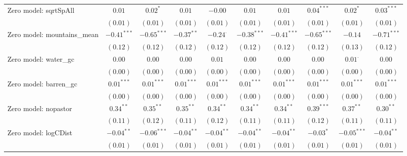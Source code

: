 \begin{sidewaystable}
\begin{center}
{\begin{tabular}{l c c c c c c c c c}
Zero model: sqrtSpAll          & $0.01$        & $0.02^{*}$    & $0.01$        & $-0.00$         & $0.01$        & $0.01$        & $0.04^{***}$  & $0.02^{*}$     & $0.03^{***}$  \\
                               & $(0.01)$      & $(0.01)$      & $(0.01)$      & $(0.01)$        & $(0.01)$      & $(0.01)$      & $(0.01)$      & $(0.01)$       & $(0.01)$      \\
Zero model: mountains\_mean    & $-0.41^{***}$ & $-0.65^{***}$ & $-0.37^{**}$  & $-0.24^{\cdot}$ & $-0.38^{***}$ & $-0.41^{***}$ & $-0.65^{***}$ & $-0.14$        & $-0.71^{***}$ \\
                               & $(0.12)$      & $(0.12)$      & $(0.12)$      & $(0.12)$        & $(0.12)$      & $(0.12)$      & $(0.12)$      & $(0.13)$       & $(0.12)$      \\
Zero model: water\_gc          & $0.00$        & $0.00$        & $0.00$        & $0.01$          & $0.00$        & $0.00$        & $0.00$        & $0.01^{\cdot}$ & $0.00$        \\
                               & $(0.00)$      & $(0.00)$      & $(0.00)$      & $(0.00)$        & $(0.00)$      & $(0.00)$      & $(0.00)$      & $(0.00)$       & $(0.00)$      \\
Zero model: barren\_gc         & $0.01^{***}$  & $0.01^{***}$  & $0.01^{***}$  & $0.01^{***}$    & $0.01^{***}$  & $0.01^{***}$  & $0.01^{***}$  & $0.01^{***}$   & $0.01^{***}$  \\
                               & $(0.00)$      & $(0.00)$      & $(0.00)$      & $(0.00)$        & $(0.00)$      & $(0.00)$      & $(0.00)$      & $(0.00)$       & $(0.00)$      \\
Zero model: nopastor           & $0.34^{**}$   & $0.35^{**}$   & $0.35^{**}$   & $0.34^{**}$     & $0.34^{**}$   & $0.34^{**}$   & $0.39^{***}$  & $0.37^{**}$    & $0.30^{**}$   \\
                               & $(0.11)$      & $(0.12)$      & $(0.11)$      & $(0.12)$        & $(0.11)$      & $(0.11)$      & $(0.12)$      & $(0.11)$       & $(0.11)$      \\
Zero model: logCDist           & $-0.04^{**}$  & $-0.06^{***}$ & $-0.04^{**}$  & $-0.04^{**}$    & $-0.04^{**}$  & $-0.04^{**}$  & $-0.03^{*}$   & $-0.05^{***}$  & $-0.04^{**}$  \\
                               & $(0.01)$      & $(0.01)$      & $(0.01)$      & $(0.01)$        & $(0.01)$      & $(0.01)$      & $(0.01)$      & $(0.01)$       & $(0.01)$      \\

\end{tabular}}
\end{center}
\end{sidewaystable}

